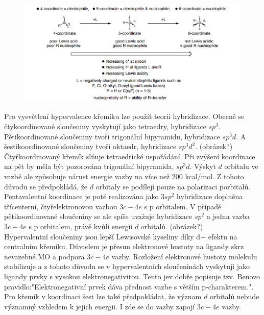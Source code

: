 \documentclass[
  digital, %
  table,   %
  lof,     %
  lot,     %
]{fithesis3}
\begin{document}
\begin{figure}[h!]
\caption{\cite{hypervalentsiliconmacmillangroup2005}}
  \center
  \includegraphics[width=12cm]{schema_silicophosphates.png}
  \label{schema_silicon_coordinate}
  \end{figure}

Pro vysvětlení hypervalence křemíku lze použít teorii hybridizace. Obecně se čtykoordinované sloučeniny vyskytují jako tetraedry, hybridizace $sp^3$. Pětikoordinované sloučeniny tvoří trigonální bipyramidu, hybridizace $sp^3d$. A šestikoordinované sloučeniny tvoří oktaedr, hybridizace $sp^3d^2$. (obrázek?) \\

Čtyřkoordinovaný křemík slňuje tetraedrické uspořádání. Při zvýšení koordinace na pět by měla být pozorována trigonální bipyramida, $sp^3d$. Výskyt $d$ orbitalu ve vazbě ale způsobuje nárust energie vazby na více než 200 kcal/mol. Z tohoto důvodu se předpokládá, že $d$ orbitaly se podílejí pouze na polarizaci porbitalů. Pentavalentní koordinace je poté realizována jako $3sp^2$ hybridizace doplněna třícenterní, čtyřelektronovou vazbou $3c-4e$ s p orbitalem.
 V případě pětikoordinované sloučeniny se ale spíše uvažuje hybridizace $sp^2$ a jedna vazba $3c-4e$ s p orbitalem, právě kvůli energii $d$ orbitalů. (obrázek?) \\
 Hypervalentní sloučeniny jsou lepší Lewisovské kyseliny díky d+ efektu na centralním křemíku. Důvodem je přesun elektronové hustoty na ligandy skrz nevazebné MO a podpora $3c-4e$ vazby. Rozložení elektronové hustoty molekulu stabilizuje a z tohoto důvodu se v hypervalentních sloučeninách vyskytují jako ligandy prvky s vysokou elektronegativitou. Tento jev dobře popisuje tzv. Benovo pravidlo:"Elektronegativní prvek dáva přednost vazbe s větším p-charakterem."\cite{hypervalentsiliconmacmillangroup2005}.\\
Pro křemík v koordinaci šest lze také předpokládat, že význam $d$ orbitalů nebude významný vzhledem k jejich energii. I zde se do vazby zapojí $3c-4e$ vazby\cite{Wagler2014}.\\
\end{document}
